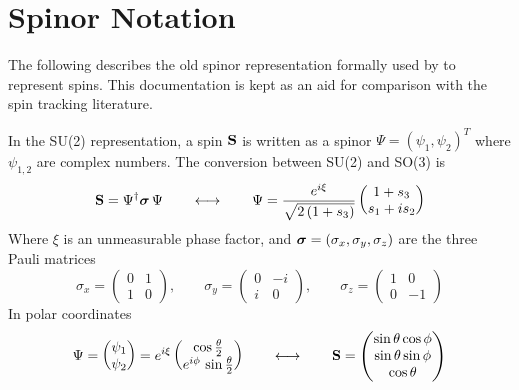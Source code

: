\section{Spinor Notation}

The following describes the old spinor representation formally used by \bmad to represent
spins. This documentation is kept as an aid for comparison with the spin tracking literature.

In the SU(2) representation, a spin ${\bf S}$ is written as a spinor $\Psi = \left( \psi_{1}, \psi_{2}
\right)^{T}$ where $\psi_{1,2}$ are complex numbers. The conversion between SU(2) and SO(3) is
\begin{equation}  
  {\bf S} = \Psi^{\dagger} {\bf \boldsymbol{\sigma}} \, \Psi 
  \qquad \longleftrightarrow \qquad
  \Psi  = \frac{e^{i \xi}}{\sqrt{2 \left(1+s_{3}\right)}}   
     \begin{pmatrix} 1+s_{3} \\ s_{1}+i s_{2} \end{pmatrix}   
\end{equation}  
Where $\xi$ is an unmeasurable phase factor, and ${\boldsymbol{\sigma}} = (\sigma_x, \sigma_y, \sigma_z)$ are
the three Pauli matrices
\begin{equation}
  \sigma_x = \begin{pmatrix} 0 &  1 \\ 1 &  0 \end{pmatrix}, \qquad
  \sigma_y = \begin{pmatrix} 0 & -i \\ i &  0 \end{pmatrix}, \qquad
  \sigma_z = \begin{pmatrix} 1 &  0 \\ 0 & -1 \end{pmatrix}
\end{equation}
In polar coordinates
\begin{equation}   
  \Psi = \begin{pmatrix} \psi_{1} \\ \psi_{2} \end{pmatrix}
       = e^{i \xi}
         \begin{pmatrix} 
            \cos \frac{\theta}{2} \\   
            e^{i \phi} \, \sin \frac{\theta}{2}
         \end{pmatrix}
  \qquad \longleftrightarrow \qquad
  {\bf S} = \begin{pmatrix} \sin \theta \cos \phi \\   
                          \sin \theta \sin \phi \\   
                          \cos \theta \end{pmatrix}
  \label{pp1p2}
\end{equation}
